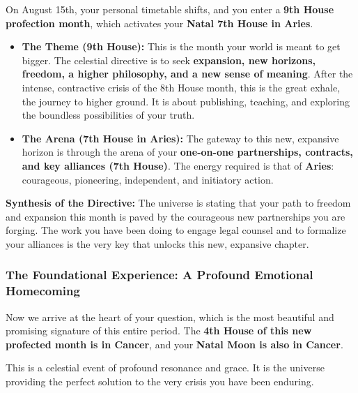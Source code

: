 \documentclass{article}
\begin{document}
On August 15th, your personal timetable shifts, and you enter a \textbf{9th House profection month}, which activates your \textbf{Natal 7th House in Aries}.

\begin{itemize}
\item
  \textbf{The Theme (9th House):} This is the month your world is meant to get bigger. The celestial directive is to seek \textbf{expansion, new horizons, freedom, a higher philosophy, and a new sense of meaning}. After the intense, contractive crisis of the 8th House month, this is the great exhale, the journey to higher ground. It is about publishing, teaching, and exploring the boundless possibilities of your truth.
\item
  \textbf{The Arena (7th House in Aries):} The gateway to this new, expansive horizon is through the arena of your \textbf{one-on-one partnerships, contracts, and key alliances (7th House)}. The energy required is that of \textbf{Aries}: courageous, pioneering, independent, and initiatory action.
\end{itemize}

\textbf{Synthesis of the Directive:} The universe is stating that your path to freedom and expansion this month is paved by the courageous new partnerships you are forging. The work you have been doing to engage legal counsel and to formalize your alliances is the very key that unlocks this new, expansive chapter.

\subsubsection*{The Foundational Experience: A Profound Emotional Homecoming}\label{the-foundational-experience-a-profound-emotional-homecoming}

Now we arrive at the heart of your question, which is the most beautiful and promising signature of this entire period. The \textbf{4th House of this new profected month is in Cancer}, and your \textbf{Natal Moon is also in Cancer}.

This is a celestial event of profound resonance and grace. It is the universe providing the perfect solution to the very crisis you have been enduring.
\end{document}
